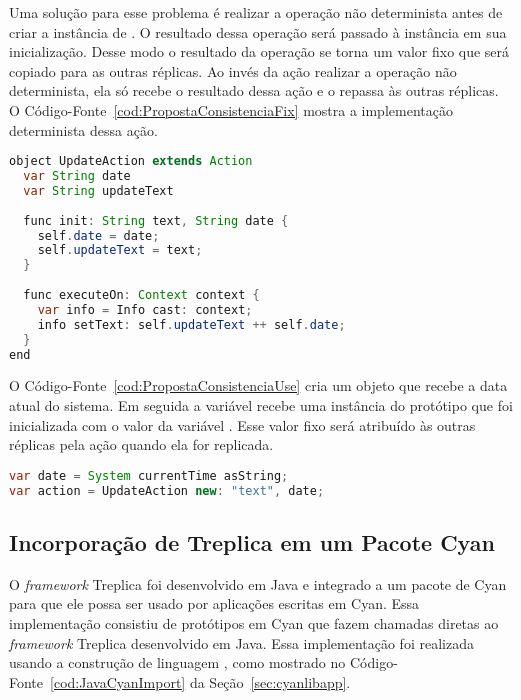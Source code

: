 Uma solução para esse problema é realizar a operação não determinista antes de criar a instância de . O resultado dessa operação será passado à instância em sua inicialização. Desse modo o resultado da operação se torna um valor fixo que será copiado para as outras réplicas. Ao invés da ação realizar a operação não determinista, ela só recebe o resultado dessa ação e o repassa às outras réplicas. O Código-Fonte~\ref{cod:PropostaConsistenciaFix} mostra a implementação determinista dessa ação.

\begin{lstlisting}[language=Java, caption={Exemplo ação determinista}, label={cod:PropostaConsistenciaFix}]
object UpdateAction extends Action
  var String date
  var String updateText
  
  func init: String text, String date {
  	self.date = date;
  	self.updateText = text;
  }
  
  func executeOn: Context context {
    var info = Info cast: context;
    info setText: self.updateText ++ self.date;
  }
end
\end{lstlisting}

O Código-Fonte~\ref{cod:PropostaConsistenciaUse} cria um objeto  que recebe a data atual do sistema. Em seguida a variável  recebe uma instância do protótipo  que foi inicializada com o valor da variável . Esse valor fixo será atribuído às outras réplicas pela ação  quando ela for replicada.

\begin{lstlisting}[language=Java, caption={Exemplo de construção da ação determinista}, label={cod:PropostaConsistenciaUse}]
var date = System currentTime asString;
var action = UpdateAction new: "text", date;
\end{lstlisting}

\subsection{Incorporação de Treplica em um Pacote Cyan}
\label{sec:packtrepcyan}

O \emph{framework} Treplica foi desenvolvido em Java e integrado a um pacote de Cyan para que ele possa ser usado por aplicações escritas em Cyan. Essa implementação consistiu de protótipos em Cyan que fazem chamadas diretas ao \emph{framework} Treplica desenvolvido em Java. Essa implementação foi realizada usando a construção de linguagem , como mostrado no Código-Fonte~\ref{cod:JavaCyanImport} da Seção~\ref{sec:cyanlibapp}.

